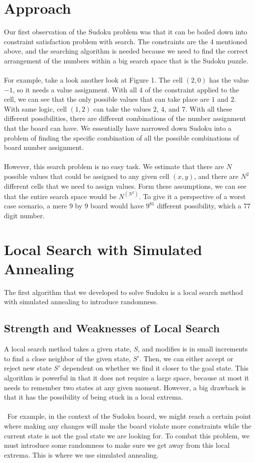 \documentclass[12pt, a4paper]{article}
\begin{document}
	\section{Approach}
		Our first observation of the Sudoku problem was that it can be boiled down into constraint satisfaction problem with search. The constraints are the 4 mentioned above, and the searching algorithm is needed because we need to find the correct arrangement of the numbers within a big search space that is the Sudoku puzzle. \\\\
		For example, take a look another look at Figure 1. The cell $(2, 0)$ has the value $-1$, so it needs a value assignment. With all 4 of the constraint applied to the cell, we can see that the only possible values that can take place are $1$ and $2$. With same logic, cell $(1, 2)$ can take the values $2$, $4$, and  $7$. With all these different possibilities, there are different combinations of the number assignment that the board can have. We essentially have narrowed down Sudoku into a problem of finding the specific combination of all the possible combinations of board number assignment.\\\\
		However, this search problem is no easy task. We estimate that there are $N$ possible values that could be assigned to any given cell $(x, y)$, and there are $N^2$ different cells that we need to assign values. Form these assumptions, we can see that the entire search space would be $N^(N^2)$. To give it a perspective of a worst case scenario, a mere 9 by 9 board would have $9^{81}$ different possibility, which a 77 digit number. 
	\section{Local Search with Simulated Annealing}
		The first algorithm that we developed to solve Sudoku is a local search method with simulated annealing to introduce randomness. 
		\subsection{Strength and Weaknesses of Local Search}
			A local search method takes a given state, $S$, and modifies is in small increments to find a close neighbor of the given state, $S'$. Then, we can either accept or reject new state $S'$ dependent on whether we find it closer to the goal state. This algorithm is powerful in that it does not require a large space, because at most it needs to remember two states at any given moment. However, a big drawback is that it has the possibility of being stuck in a local extrema.\\\\\
			For example, in the context of the Sudoku board, we might reach a certain point where making any changes will make the board violate more constraints while the current state is not the goal state we are looking for. To combat this problem, we must introduce some randomness to make sure we get away from this local extrema. This is where we use simulated annealing.
\end{document}
